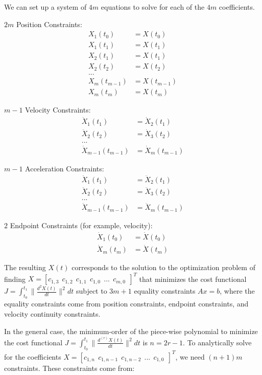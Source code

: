\documentclass[11pt]{article}
\begin{document}
We can set up a system of $4m$ equations to solve for each of the $4m$ coefficients. 

\mbox{} \newline
$2m$ Position Constraints: 
\begin{align*}
X_1(t_0) &= X(t_0) \\
X_1(t_1) &= X(t_1) \\
X_2(t_1) &= X(t_1) \\
X_2(t_2) &= X(t_2) \\
... & \\
X_m(t_{m-1}) &= X(t_{m-1}) \\
X_m(t_{m}) &= X(t_{m}) 
\end{align*}

\mbox{} \newline
$m-1$ Velocity Constraints: 
\begin{align*}
\dot{X}_1(t_1) &= \dot{X}_2(t_1) \\
\dot{X}_2(t_2) &= \dot{X}_3(t_2) \\
... & \\
\dot{X}_{m-1}(t_{m-1}) &= \dot{X}_m(t_{m-1})
\end{align*}

\mbox{} \newline
$m-1$ Acceleration Constraints: 
\begin{align*}
\ddot{X}_1(t_1) &= \ddot{X}_2(t_1) \\
\ddot{X}_2(t_2) &= \ddot{X}_3(t_2) \\
... & \\
\ddot{X}_{m-1}(t_{m-1}) &= \ddot{X}_m(t_{m-1})
\end{align*}

\mbox{} \newline
$2$ Endpoint Constraints (for example, velocity):
\begin{align*}
\dot{X}_1(t_0) &= \dot{X}(t_0) \\
\dot{X}_{m}(t_{m}) &= \dot{X}(t_m)
\end{align*}

The resulting $X(t)$ corresponds to the solution to the optimization problem of finding $X = [c_{1, 3} \ \ c_{1, 2} \ \ c_{1, 1} \ \ c_{1, 0} \ \ ... \ \ c_{m, 0} \ \ ]^T$ that minimizes the cost functional $J = \int_{t_0}^{t_1} \|  \frac{d^{2} X(t) }{dt} \|^2 dt $ subject to $3m+1$ equality constraints $Ax = b$, where the equality constraints come from position constraints, endpoint constraints, and velocity continuity constraints. 

\mbox{} \newline
In the general case, the minimum-order of the piece-wise polynomial to minimize the cost functional $J = \int_{t_0}^{t_1} \|  \frac{d^{(r)} X(t) }{dt} \|^2 dt $ is $n = 2r-1$. To analytically solve for the coefficients $X = [c_{1, n} \ \ c_{1, n-1} \ \ c_{1, n-2} \ \ ... \ \ c_{1, 0} \ \ ]^T$, we need $(n+1)m$ constraints. These constraints come from:
\end{document}

